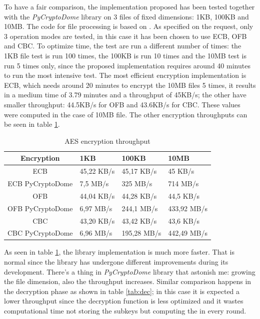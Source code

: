 \documentclass{article}
\begin{document}
To have a fair comparison, the implementation proposed has been tested together with the \textit{PyCryptoDome} library on 3 files of fixed dimensions: 1KB, 100KB and 10MB. The code for file processing is based on \cite{pycryptodome}. As specified on the request, only 3 operation modes are tested, in this case it has been chosen to use ECB, OFB and CBC. To optimize time, the test are run a different number of times: the 1KB file test is run 100 times, the 100KB is run 10 times and the 10MB test is run 5 times only, since the proposed implementation requires around 40 minutes to run the most intensive test.
\newline
The most efficient encryption implementation is ECB, which needs around 20 minutes to encrypt the 10MB files 5 times, it results in a medium time of 3.79 minutes and a throughput of 45KB/s; the other have smaller throughput: 44.5KB/s for OFB and 43.6KB/s for CBC. These values were computed in the case of 10MB file. The other encryption throughputs can be seen in table \ref{tab:enc}.

\renewcommand{\arraystretch}{2}

\begin{table}[H]
\begin{center}
\begin{tabular}{ |c || m{2cm} | m{2cm} | m{2cm}|  }
\hline
  Encryption & 1KB & 100KB & 10MB \\ [0.5ex] 
 \hline\hline
   ECB & 45,22 KB/s & 45,17 KB/s & 45 KB/s \\ 
 \hline
  ECB PyCryptoDome & 7,5 MB/s & 325 MB/s & 714 MB/s \\ 
 \hline
 OFB & 44,04 KB/s & 44,28 KB/s &  44,5 KB/s \\
 \hline
  OFB PyCryptoDome & 6,97 MB/s & 244,1 MB/s &  433,92 MB/s \\
 \hline
 CBC & 43,20 KB/s & 43,42 KB/s &  43,6 KB/s \\ 
 \hline
  CBC PyCryptoDome & 6,96 MB/s & 195,28 MB/s &  442,49 MB/s \\
 \hline
\end{tabular}
\caption{AES encryption throughput}
\label{tab:enc}
\end{center}
\end{table}

As seen in table \ref{tab:enc}, the library implementation is much more faster. That is normal since the library has undergone different improvements during its development. There's a thing in \textit{PyCryptoDome} library that astonish me: growing the file dimension, also the throughput increases. Similar comparison happens in the decryption phase as shown in table \ref{tab:dec}; in this case it is expected a lower throughput since the decryption function is less optimized and it wastes computational time not storing the subkeys but computing the in every round.
\end{document}
